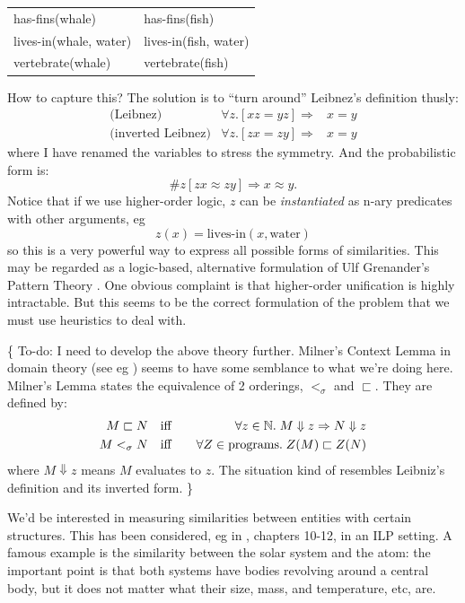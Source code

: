 \tab \tab \tab
\begin{tabular}{l|l}
has-fins(whale)        & has-fins(fish)\\
lives-in(whale, water) & lives-in(fish, water)\\
vertebrate(whale)      & vertebrate(fish)\\
\end{tabular}

How to capture this?  The solution is to ``turn around'' Leibnez's definition thusly:
\begin{eqnarray}
\mbox{(Leibnez)}           & \forall z. [x z = y z] \Rightarrow& x = y \\
\mbox{(inverted Leibnez)}  & \forall z. [z x = z y] \Rightarrow& x = y
\label{eqn:inverted-extensionality}
\end{eqnarray}
where I have renamed the variables to stress the symmetry.  And the probabilistic form is:
\begin{equation}
\# z [z x \approx z y]  \Rightarrow x \approx y.
\end{equation}
Notice that if we use higher-order logic, $z$ can be \textit{instantiated} as n-ary predicates with other arguments, eg
 $$z(x) = \mbox{lives-in}(x, \mbox{water})$$
so this is a very powerful way to express all possible forms of similarities.  This may be regarded as a logic-based, alternative formulation of Ulf Grenander's Pattern Theory \citep*{Grenander2007}.  One obvious complaint is that higher-order unification is highly intractable.  But this seems to be the correct formulation of the problem that we must use heuristics to deal with.

\{ To-do:  I need to develop the above theory further.  Milner's Context Lemma in domain theory (see eg \citep*{Streicher2006}) seems to have some semblance to what we're doing here.  Milner's Lemma states the equivalence of 2 orderings, $<_{\sigma}$ and $\sqsubset$.  They are defined by:
\begin{eqnarray}
M \sqsubset N  \quad  &\mbox{iff}& \quad \forall z \in \mathbb{N}. \; M \Downarrow z \Rightarrow N \Downarrow z \\
M <_{\sigma} N \quad  &\mbox{iff}& \quad \forall Z \in \mbox{programs.} \; Z(M) \sqsubset Z(N)
\end{eqnarray}
where $M \Downarrow z$ means $M$ evaluates to $z$.  The situation kind of resembles Leibniz's definition and its inverted form.
\}

We'd be interested in measuring similarities between entities with certain structures.  This has been considered, eg in \citep*{Schmid2003}, chapters 10-12, in an ILP setting.  A famous example is the similarity between the solar system and the atom:  the important point is that both systems have bodies revolving around a central body, but it does not matter what their size, mass, and temperature, etc, are.

